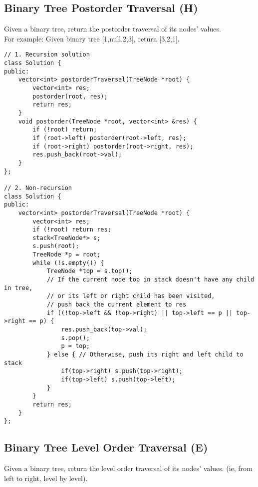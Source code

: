 \subsection{Binary Tree Postorder Traversal (H)}
Given a binary tree, return the postorder traversal of its nodes' values. \\

For example: Given binary tree [1,null,2,3], return [3,2,1]. \\

\begin{lstlisting}
// 1. Recursion solution
class Solution {
public:
    vector<int> postorderTraversal(TreeNode *root) {
        vector<int> res;
        postorder(root, res);
        return res;
    }
    void postorder(TreeNode *root, vector<int> &res) {
        if (!root) return;
        if (root->left) postorder(root->left, res);
        if (root->right) postorder(root->right, res);
        res.push_back(root->val);
    }
};

// 2. Non-recursion
class Solution {
public:
    vector<int> postorderTraversal(TreeNode *root) {
        vector<int> res;
        if (!root) return res;
        stack<TreeNode*> s;
        s.push(root);
        TreeNode *p = root;
        while (!s.empty()) {
            TreeNode *top = s.top();
            // If the current node top in stack doesn't have any child in tree,
            // or its left or right child has been visited,
            // push back the current element to res
            if ((!top->left && !top->right) || top->left == p || top->right == p) {
                res.push_back(top->val);
                s.pop();
                p = top;
            } else { // Otherwise, push its right and left child to stack
                if(top->right) s.push(top->right);
                if(top->left) s.push(top->left);
            }
        }
        return res;
    }
};
\end{lstlisting}


\subsection{Binary Tree Level Order Traversal (E)}
Given a binary tree, return the level order traversal of its nodes' values. (ie, from left to right, level by level).\\

